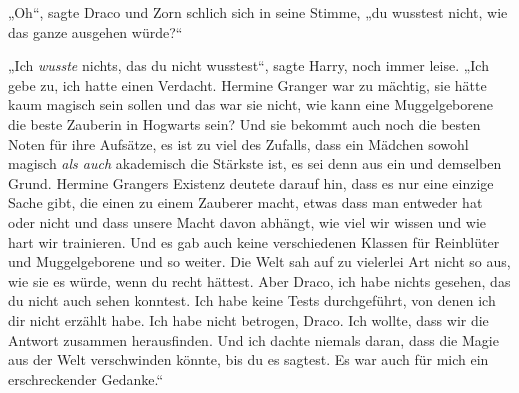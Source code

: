 „Oh“, sagte Draco und Zorn schlich sich in seine Stimme, „du wusstest nicht, wie das ganze ausgehen würde?“

„Ich \emph{wusste} nichts, das du nicht wusstest“, sagte Harry, noch immer leise.
„Ich gebe zu, ich hatte einen Verdacht. Hermine Granger war zu mächtig, sie hätte kaum magisch sein sollen und das war sie nicht, wie kann eine Muggelgeborene die beste Zauberin in Hogwarts sein? Und sie bekommt auch noch die besten Noten für ihre Aufsätze, es ist zu viel des Zufalls, dass ein Mädchen sowohl magisch \emph{als auch} akademisch die Stärkste ist, es sei denn aus ein und demselben Grund. Hermine Grangers Existenz deutete darauf hin, dass es nur eine einzige Sache gibt, die einen zu einem Zauberer macht, etwas dass man entweder hat oder nicht und dass unsere Macht davon abhängt, wie viel wir wissen und wie hart wir trainieren. Und es gab auch keine verschiedenen Klassen für Reinblüter und Muggelgeborene und so weiter. Die Welt sah auf zu vielerlei Art nicht so aus, wie sie es würde, wenn du recht hättest. Aber Draco, ich habe nichts gesehen, das du nicht auch sehen konntest. Ich habe keine Tests durchgeführt, von denen ich dir nicht erzählt habe. Ich habe nicht betrogen, Draco. Ich wollte, dass wir die Antwort zusammen herausfinden. Und ich dachte niemals daran, dass die Magie aus der Welt verschwinden könnte, bis du es sagtest. Es war auch für mich ein erschreckender Gedanke.“

